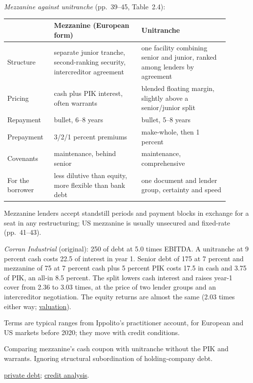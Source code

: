 \begin{qfmethod}
\emph{Mezzanine against unitranche} (pp.~39--45, Table~2.4):
\begin{center}\small
\begin{tabular}{@{}p{0.18\linewidth}p{0.36\linewidth}p{0.36\linewidth}@{}}
\toprule
 & Mezzanine (European form) & Unitranche \\
\midrule
Structure & separate junior tranche, second-ranking security, intercreditor agreement & one facility combining senior and junior, ranked among lenders by agreement \\
Pricing & cash plus PIK interest, often warrants & blended floating margin, slightly above a senior/junior split \\
Repayment & bullet, 6--8 years & bullet, 5--8 years \\
Prepayment & 3/2/1 percent premiums & make-whole, then 1 percent \\
Covenants & maintenance, behind senior & maintenance, comprehensive \\
For the borrower & less dilutive than equity, more flexible than bank debt & one document and lender group, certainty and speed \\
\bottomrule
\end{tabular}
\end{center}
Mezzanine lenders accept standstill periods and payment blocks in exchange for a seat in any restructuring; US mezzanine is usually unsecured and fixed-rate (pp.~41--43).

 \emph{Corran Industrial} (original): 250 of debt at 5.0 times EBITDA. A unitranche at 9 percent cash costs 22.5 of interest in year 1. Senior debt of 175 at 7 percent and mezzanine of 75 at 7 percent cash plus 5 percent PIK costs 17.5 in cash and 3.75 of PIK, an all-in 8.5 percent. The split lowers cash interest and raises year-1 cover from 2.36 to 3.03 times, at the price of two lender groups and an intercreditor negotiation. The equity returns are almost the same (2.03 times either way; \hyperref[meth:private-equity-valuation]{valuation}).

 Terms are typical ranges from Ippolito's practitioner account, for European and US markets before 2020; they move with credit conditions.

 Comparing mezzanine's cash coupon with unitranche without the PIK and warrants. Ignoring structural subordination of holding-company debt.

 \hyperref[def:private-debt-features]{private debt}; \hyperref[meth:private-debt-credit-analysis]{credit analysis}.

\end{qfmethod}

